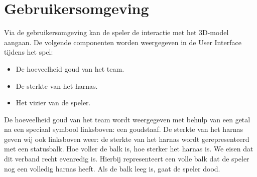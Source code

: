 \section{Gebruikersomgeving}
\label{sec:UI}

Via de gebruikersomgeving kan de speler de interactie met het 3D-model aangaan. De volgende componenten worden weergegeven in de User Interface tijdens het spel:
\begin{itemize}
\item De hoeveelheid goud van het team.
\item De sterkte van het harnas.
\item Het vizier van de speler.
\end{itemize}

De hoeveelheid goud van het team wordt weergegeven met behulp van een getal na een speciaal symbool linksboven: een goudstaaf. De sterkte van het harnas geven wij ook linksboven weer: de sterkte van het harnas wordt gerepresenteerd met een statusbalk. Hoe voller de balk is, hoe sterker het harnas is. We eisen dat dit verband recht evenredig is. Hierbij representeert een volle balk dat de speler nog een volledig harnas heeft. Als de balk leeg is, gaat de speler dood.

